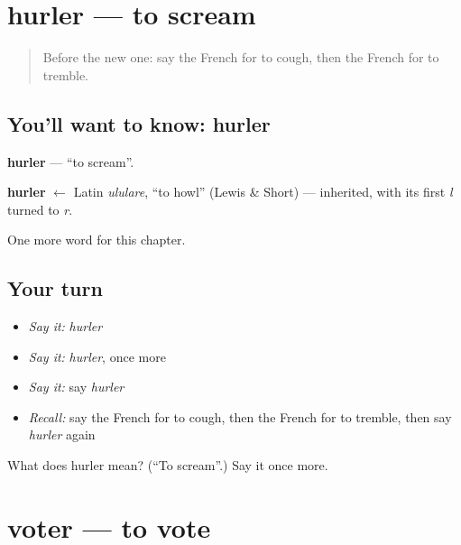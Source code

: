 \section[hurler]{hurler — to scream}

\label{lesson:FR-C241-hurler}



\begin{quote}
Before the new one: say the French for to cough, then the French for to tremble.
\end{quote}

\subsection*{You'll want to know: hurler}
\textbf{hurler} — \textquotedblleft{}to scream\textquotedblright{}.

\begin{cousinweb}
\textbf{hurler} $\leftarrow$ Latin \emph{ululare}, \textquotedblleft{}to howl\textquotedblright{} (Lewis \& Short) — inherited, with its first \emph{l} turned to \emph{r}.
\end{cousinweb}

\begin{grammarlens}[title={What you've built}]
One more word for this chapter.
\end{grammarlens}

\subsection*{Your turn}
\begin{itemize}
\raggedright
  \item \emph{Say it:} \emph{hurler}
  \item \emph{Say it:} \emph{hurler}, once more
  \item \emph{Say it:} say \emph{hurler}
  \item \emph{Recall:} say the French for to cough, then the French for to tremble, then say \emph{hurler} again
\end{itemize}

\begin{tcolorbox}[breakable,colback=teal!4,colframe=teal!35!black,title={Before you move on}]
What does hurler mean? (\textquotedblleft{}To scream\textquotedblright{}.) Say it once more.
\end{tcolorbox}
\section[voter]{voter — to vote}

